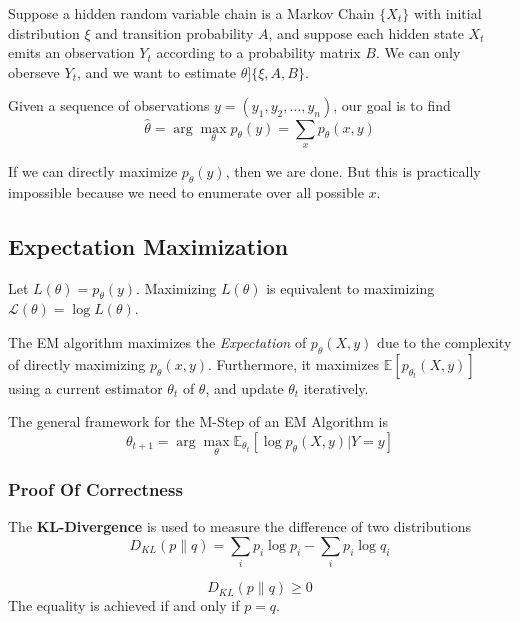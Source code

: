     Suppose a hidden random variable chain is a Markov Chain $\{X_t\}$ with initial distribution $\xi$ and transition probability $A$, and suppose each hidden state $X_t$ emits an observation $Y_t$ according to a probability matrix $B$. We can only oberseve $Y_t$, and we want to estimate $\theta ] \{\xi, A, B\}$.

    Given a sequence of observations $y = (y_1, y_2, \dots ,y_n)$, our goal is to find
    \[ \hat{\theta} = \arg\max_{\theta} p_{\theta}(y) = \sum_x p_{\theta}(x,y) \]

    If we can directly maximize $p_{\theta}(y)$, then we are done. But this is practically impossible because we need to enumerate over all possible $x$.
    
    \subsection{Expectation Maximization}
        Let $L(\theta) = p_{\theta}(y)$. Maximizing $L(\theta)$ is equivalent to maximizing $\mathcal{L}(\theta) = \log L(\theta)$.

        The EM algorithm maximizes the \emph{Expectation} of $p_{\theta}(X,y)$ due to the complexity of directly maximizing $p_{\theta}(x,y)$. Furthermore, it maximizes $\mathbb{E}[p_{\theta_t}(X,y)]$ using a current estimator $\theta_t$ of $\theta$, and update $\theta_t$ iteratively.

        The general framework for the M-Step of an EM Algorithm is
        \[ \theta_{t+1} = \arg\max_{\theta} \mathbb{E}_{\theta_t}\left[ \log p_{\theta}(X,y)|Y=y \right] \]

        \subsubsection{Proof Of Correctness}
        \begin{definition}[KL Divergence]\label{Def:KLDivergence}
            The \textbf{KL-Divergence} is used to measure the difference of two distributions
            \[ D_{KL}(p\|q) = \sum_i p_i\log p_i - \sum_i p_i \log q_i \]
        \end{definition}
        \begin{proposition}\label{Prop:PositivityOfKLDivergence}
            \[ D_{KL}(p\|q) \ge 0 \]
            The equality is achieved if and only if $p=q$.
        \end{proposition}

